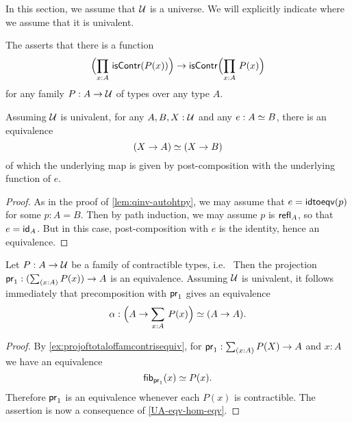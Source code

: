 %
In this section, we assume that $\type$ is a universe.
We will explicitly indicate where we assume that it is univalent.

\begin{defn}\label{weakfunext}
The 
%
asserts that there is a function
\begin{equation*}
\Parens{\prd{x:A}\iscontr(P(x))} \to\iscontr\Parens{\prd{x:A}P(x)}
\end{equation*}
for any family $P:A\to\type$ of types over any type $A$.
\end{defn}

\begin{lem} \label{UA-eqv-hom-eqv}
Assuming $\type$ is univalent, for any $A,B,X:\type$ and any $e:\eqv{A}{B}$, there is an equivalence
\begin{equation*}
\eqv{(X\to A)}{(X\to B)}
\end{equation*}
of which the underlying map is given by post-composition with the underlying function of $e$.
\end{lem}

\begin{proof}
  As in the proof of \autoref{lem:qinv-autohtpy}, we may assume that $e = \idtoeqv(p)$ for some $p:A=B$.
  Then by path induction, we may assume $p$ is $\refl{A}$, so that $e = \idfunc[A]$.
  But in this case, post-composition with $e$ is the identity, hence an equivalence.
\end{proof}

\begin{cor}\label{contrfamtotalpostcompequiv}
Let $P:A\to\type$ be a family of contractible types, i.e.\ 
Then the projection $\proj{1}:(\sm{x:A}P(x))\to A$ is an equivalence. Assuming $\type$ is univalent, it follows immediately that precomposition with $\proj{1}$ gives an equivalence
\begin{equation*}
\alpha : \eqv{\Parens{A\to\sm{x:A}P(x)}}{(A\to A)}.
\end{equation*}
\end{cor}

\begin{proof}
  By \autoref{ex:projoftotaloffamcontrisequiv}, for $\proj{1}:\sm{x:A}P(X)\to A$ and $x:A$ we have an equivalence
  \begin{equation*}
    \eqv{\hfiber{\proj{1}}{x}}{P(x)}.
  \end{equation*}
  Therefore $\proj{1}$ is an equivalence whenever each $P(x)$ is contractible. The assertion is now a consequence of  \autoref{UA-eqv-hom-eqv}.
\end{proof}

